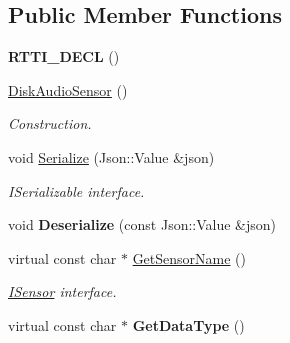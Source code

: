 \subsection*{Public Member Functions}
\begin{DoxyCompactItemize}
\item 
\mbox{\label{class_disk_audio_sensor_ab7a536d98f84a415e1e594ee6b67d285}} 
{\bfseries R\+T\+T\+I\+\_\+\+D\+E\+CL} ()
\item 
\mbox{\label{class_disk_audio_sensor_af2c053fa2821b9e4f72ffefdfc831229}} 
\hyperlink{class_disk_audio_sensor_af2c053fa2821b9e4f72ffefdfc831229}{Disk\+Audio\+Sensor} ()
\begin{DoxyCompactList}\small\item\em Construction. \end{DoxyCompactList}\item 
\mbox{\label{class_disk_audio_sensor_acfa38d87a557de544ec7fb16d1a7f464}} 
void \hyperlink{class_disk_audio_sensor_acfa38d87a557de544ec7fb16d1a7f464}{Serialize} (Json\+::\+Value \&json)
\begin{DoxyCompactList}\small\item\em I\+Serializable interface. \end{DoxyCompactList}\item 
\mbox{\label{class_disk_audio_sensor_ad4a871a18e5c375ee60e7cf4a13ba59a}} 
void {\bfseries Deserialize} (const Json\+::\+Value \&json)
\item 
\mbox{\label{class_disk_audio_sensor_ac0deead63e4f35c90cf32a4046084e92}} 
virtual const char $\ast$ \hyperlink{class_disk_audio_sensor_ac0deead63e4f35c90cf32a4046084e92}{Get\+Sensor\+Name} ()
\begin{DoxyCompactList}\small\item\em \hyperlink{class_i_sensor}{I\+Sensor} interface. \end{DoxyCompactList}\item 
\mbox{\label{class_disk_audio_sensor_ae39fded0d11e45d915ac7141ebf70c53}} 
virtual const char $\ast$ {\bfseries Get\+Data\+Type} ()
\item 
\mbox{\label{class_disk_audio_sensor_a77d25c71d6978e80f2202f417fbb4192}} 

\end{DoxyCompactItemize}
